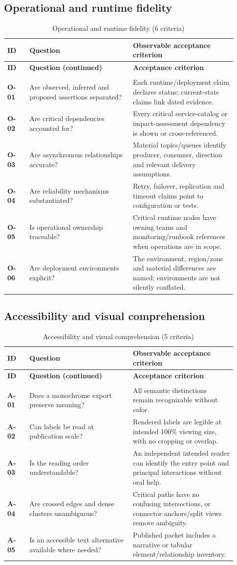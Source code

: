 \documentclass[10pt,letterpaper]{article}
\newcommand{\CheckRow}[3]{\textbf{\textsf{#1}} & #2 & #3\\[3pt]}
\newcommand{\ChecklistHeader}{\toprule
\textbf{ID} & \textbf{Question} & \textbf{Observable acceptance criterion}\\\midrule
\endfirsthead
\toprule\textbf{ID} & \textbf{Question (continued)} & \textbf{Acceptance criterion}\\\midrule
\endhead
\midrule\multicolumn{3}{r}{\footnotesize Continued on next page}\\\endfoot
\bottomrule\endlastfoot}
\begin{document}
\subsection{Operational and runtime fidelity}
\begin{longtable}{@{}>{\raggedright\arraybackslash}p{0.09\linewidth}>{\raggedright\arraybackslash}p{0.42\linewidth}>{\raggedright\arraybackslash}p{0.42\linewidth}@{}}
\caption{Operational and runtime fidelity (6 criteria)}\label{tab:review-O}\\
\ChecklistHeader
\CheckRow{O-01}{Are observed, inferred and proposed assertions separated?}{Each runtime/deployment claim declares status; current-state claims link dated evidence.}
\CheckRow{O-02}{Are critical dependencies accounted for?}{Every critical service-catalog or impact-assessment dependency is shown or cross-referenced.}
\CheckRow{O-03}{Are asynchronous relationships accurate?}{Material topics/queues identify producer, consumer, direction and relevant delivery assumptions.}
\CheckRow{O-04}{Are reliability mechanisms substantiated?}{Retry, failover, replication and timeout claims point to configuration or tests.}
\CheckRow{O-05}{Is operational ownership traceable?}{Critical runtime nodes have owning teams and monitoring/runbook references when operations are in scope.}
\CheckRow{O-06}{Are deployment environments explicit?}{The environment, region/zone and material differences are named; environments are not silently conflated.}
\end{longtable}

\subsection{Accessibility and visual comprehension}
\begin{longtable}{@{}>{\raggedright\arraybackslash}p{0.09\linewidth}>{\raggedright\arraybackslash}p{0.42\linewidth}>{\raggedright\arraybackslash}p{0.42\linewidth}@{}}
\caption{Accessibility and visual comprehension (5 criteria)}\label{tab:review-A}\\
\ChecklistHeader
\CheckRow{A-01}{Does a monochrome export preserve meaning?}{All semantic distinctions remain recognizable without color.}
\CheckRow{A-02}{Can labels be read at publication scale?}{Rendered labels are legible at intended 100\% viewing size, with no cropping or overlap.}
\CheckRow{A-03}{Is the reading order understandable?}{An independent intended reader can identify the entry point and principal interactions without oral help.}
\CheckRow{A-04}{Are crossed edges and dense clusters unambiguous?}{Critical paths have no confusing intersections, or connector anchors/split views remove ambiguity.}
\CheckRow{A-05}{Is an accessible text alternative available where needed?}{Published packet includes a narrative or tabular element/relationship inventory.}
\end{longtable}
\end{document}
